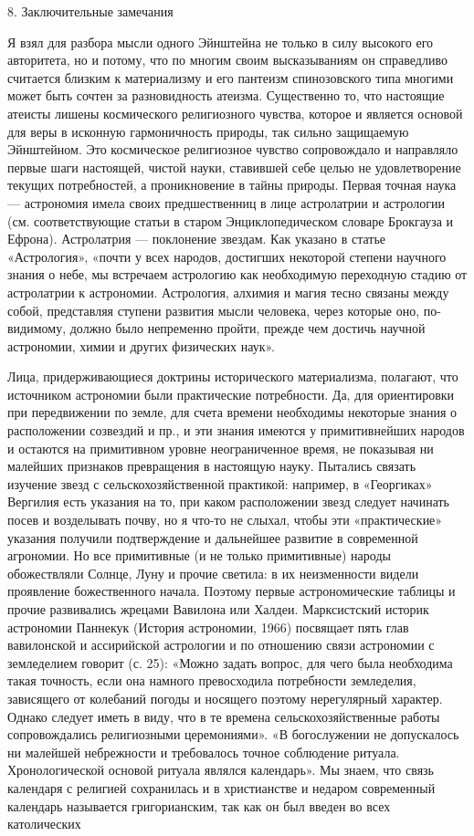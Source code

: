 8. Заключительные замечания

Я взял для разбора мысли одного Эйнштейна не только в силу высокого его
авторитета, но и потому, что по многим своим высказываниям он справедливо
считается близким к материализму и его пантеизм спинозовского типа многими
может быть сочтен за разновидность атеизма. Существенно то, что настоящие
атеисты лишены космического религиозного чувства, которое и является основой
для веры в исконную гармоничность природы, так сильно защищаемую Эйнштейном.
Это космическое религиозное чувство сопровождало и направляло первые шаги
настоящей, чистой науки, ставившей себе целью не удовлетворение текущих
потребностей, а проникновение в тайны природы. Первая точная наука --- астрономия
имела своих предшественниц в лице астролатрии и астрологии (см.
соответствующие статьи в старом Энциклопедическом словаре Брокгауза и Ефрона).
Астролатрия --- поклонение звездам. Как указано в статье «Астрология», «почти у
всех народов, достигших некоторой степени научного знания о небе, мы встречаем
астрологию как необходимую переходную стадию от астролатрии к астрономии.
Астрология, алхимия и магия тесно связаны между собой, представляя ступени
развития мысли человека, через которые оно, по-видимому, должно было непременно
пройти, прежде чем достичь научной астрономии, химии и других физических наук».

Лица, придерживающиеся доктрины исторического материализма, полагают, что
источником астрономии были практические потребности. Да, для ориентировки при
передвижении по земле, для счета времени необходимы некоторые знания о
расположении созвездий и пр., и эти знания имеются у примитивнейших народов и
остаются на примитивном уровне неограниченное время, не показывая ни малейших
признаков превращения в настоящую науку. Пытались связать изучение звезд с
сельскохозяйственной практикой: например, в «Георгиках» Вергилия есть указания
на то, при каком расположении звезд следует начинать посев и возделывать почву,
но я что-то не слыхал, чтобы эти «практические» указания получили подтверждение
и дальнейшее развитие в современной агрономии. Но все примитивные (и не только
примитивные) народы обожествляли Солнце, Луну и прочие светила: в их
неизменности видели проявление божественного начала. Поэтому первые
астрономические таблицы и прочие развивались жрецами Вавилона или Халдеи.
Марксистский историк астрономии Паннекук (История астрономии, 1966) посвящает
пять глав вавилонской и ассирийской астрологии и по отношению связи астрономии
с земледелием говорит (с. 25): «Можно задать вопрос, для чего была необходима
такая точность, если она намного превосходила потребности земледелия,
зависящего от колебаний погоды и носящего поэтому нерегулярный характер. Однако
следует иметь в виду, что в те времена сельскохозяйственные работы
сопровождались религиозными церемониями». «В богослужении не допускалось ни
малейшей небрежности и требовалось точное соблюдение ритуала. Хронологической
основой ритуала являлся календарь». Мы знаем, что связь календаря с религией
сохранилась и в христианстве и недаром современный календарь называется
григорианским, так как он был введен во всех католических
